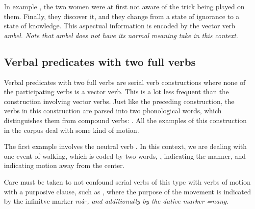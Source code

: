 In example , the two women were at first not aware of the trick being played on them. Finally, they discover it, and they change from a state of ignorance to a state of knowledge. This aspectual information is encoded by the vector verb \em ambel\em. Note that \em ambel \em does not have its normal meaning \em take \em in this context.

\subsection{Verbal predicates with two full verbs}\label{sec:pred:Verbalpredicateswithtwofullverbs}
Verbal predicates with two full verbs are serial verb constructions where none of the participating verbs is a vector verb. This is a lot less frequent than the construction involving vector verbs. Just like the preceding construction, the verbs in this construction are parsed into two phonological words, which distinguishes them from compound verbs: . All the examples of this construction in the corpus deal with some kind of motion.

The first example involves the neutral verb . In this context, we are dealing with one event of walking, which is coded by two words, , indicating the manner, and  indicating motion away from the center. 



Care must be taken to not confound serial verbs of this type with verbs of motion with a purposive clause, such as , where the purpose of the movement is indicated by the infinitve marker \em mà-\em, and additionally by the dative marker \em =nang\em.




